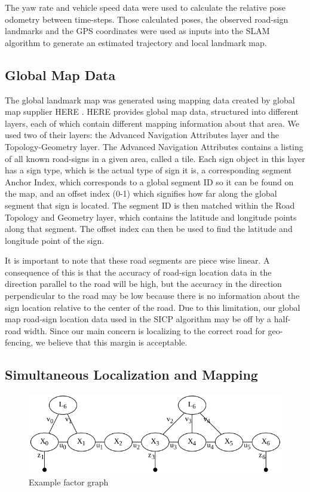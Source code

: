 \documentclass[letterpaper, 10 pt, conference]{ieeeconf}  %
\begin{document}
The yaw rate and vehicle speed data were used to calculate the relative pose odometry between time-steps. Those calculated poses, the observed road-sign landmarks and the GPS coordinates were used as inputs into the SLAM algorithm to generate an estimated trajectory and local landmark map. 

\subsection{Global Map Data}

The global landmark map was generated using mapping data created by global map supplier HERE \cite{cHERE}. HERE provides global map data, structured into different layers, each of which contain different mapping information about that area. We used two of their layers: the Advanced Navigation Attributes layer and the Topology-Geometry layer. The Advanced Navigation Attributes contains a listing of all known road-signs in a given area, called a tile. Each sign object in this layer has a sign type, which is the actual type of sign it is, a corresponding segment Anchor Index, which corresponds to a global segment ID so it can be found on the map, and an offset index (0-1) which signifies how far along the global segment that sign is located. The segment ID is then matched within the Road Topology and Geometry layer, which contains the latitude and longitude points along that segment. The offset index can then be used to find the latitude and longitude point of the sign.

It is important to note that these road segments are piece wise linear. A consequence of this is that the accuracy of road-sign location data in the direction parallel to the road will be high, but the accuracy in the direction perpendicular to the road may be low because there is no information about the sign location relative to the center of the road. Due to this limitation, our global map road-sign location data used in the SICP algorithm may be off by a half-road width. Since our main concern is localizing to the correct road for geo-fencing, we believe that this margin is acceptable.

\subsection{Simultaneous Localization and Mapping}

\begin{figure}[thpb]
  \centering
  \includegraphics[width=\linewidth]{factor_graph.png}
  \caption{Example factor graph}
  \label{fig:factorgraph}
\end{figure}
\end{document}
